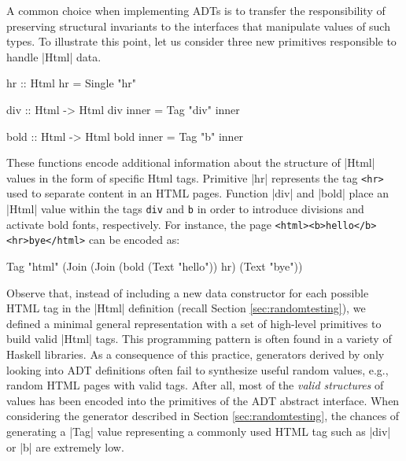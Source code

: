 A common choice when implementing ADTs is to transfer the responsibility of
preserving structural invariants to the interfaces that manipulate values of
such types.
%
To illustrate this point, let us consider three new primitives responsible to
handle |Html| data.
%
\begin{code}
  hr :: Html
  hr = Single "hr"

  div :: Html -> Html
  div inner = Tag "div" inner

  bold :: Html -> Html
  bold inner = Tag "b" inner
\end{code}
%
%
These functions encode additional information about the structure of |Html|
values in the form of specific Html tags.
%
Primitive |hr| represents the tag \texttt{<hr>} used to separate content in an
HTML pages.
%
Function |div| and |bold| place an |Html| value within the tags \texttt{div} and
\texttt{b} in order to introduce divisions and activate bold fonts,
respectively.
%
For instance, the page \texttt{<html><b>hello</b><hr>bye</html>} can be encoded
as:
%
\begin{code}
Tag "html" (Join (Join
  (bold (Text "hello")) hr) (Text "bye"))
\end{code}
%
%
Observe that, instead of including a new data constructor for each possible HTML
tag in the |Html| definition (recall Section \ref{sec:randomtesting}), we
defined a minimal general representation with a set of high-level primitives to
build valid |Html| tags.
%
%
This programming pattern is often found in a variety of Haskell libraries.
%
%
As a consequence of this practice, generators derived by only looking into ADT
definitions often fail to synthesize useful random values, e.g., random HTML
pages with valid tags.
%
After all, most of the \emph{valid structures} of values has been encoded into
the primitives of the ADT abstract interface.
%
When considering the generator described in Section \ref{sec:randomtesting}, the
chances of generating a |Tag| value representing a commonly used HTML tag such
as |div| or |b| are extremely low.


